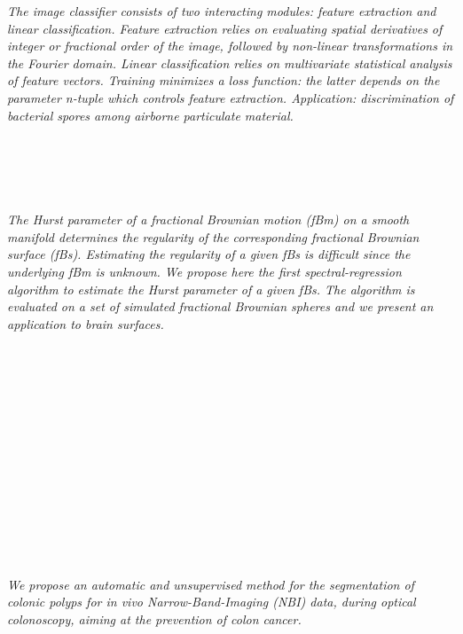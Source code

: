   \begin{multicols}{2}
      \textit{The image classifier consists of two interacting modules: feature extraction and linear classification. Feature extraction relies on evaluating spatial derivatives of integer or fractional order of the image, followed by non-linear transformations in the Fourier domain. Linear classification relies on multivariate statistical analysis of feature vectors. Training minimizes a loss function: the latter depends on the parameter n-tuple which controls feature extraction. Application: discrimination of bacterial spores among airborne particulate material.}\\
\\ 
        \\
        \\\\
\\
      \textit{The Hurst parameter of a fractional Brownian motion (fBm) on a smooth manifold determines the regularity of the corresponding
fractional Brownian surface (fBs). Estimating the regularity of a given fBs is difficult since the underlying fBm is unknown. We propose here the first spectral-regression algorithm to estimate the Hurst parameter of a given fBs. The algorithm is evaluated on a set of simulated fractional Brownian spheres and we present an application to brain surfaces.}\\
\\ 
        \\
        \\\\
        \\
        \\\\
        \\
        \\\\
        \\
        \\\\
\\
      \textit{We propose an automatic and unsupervised method for the segmentation of colonic polyps for   in vivo  Narrow-Band-Imaging (NBI) data, during optical colonoscopy,  aiming at the prevention of colon cancer.
}
\end{multicols}
